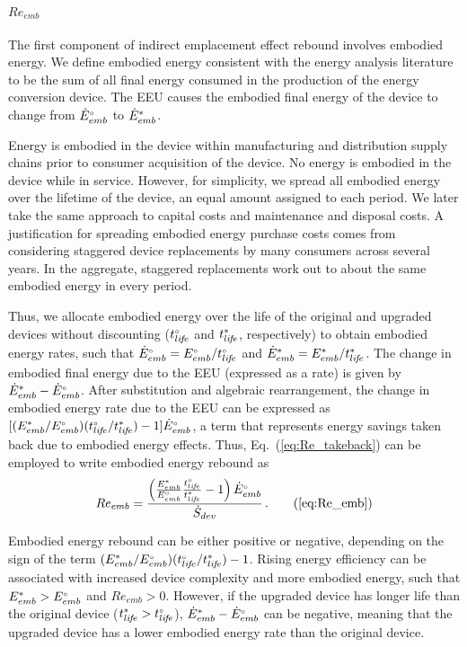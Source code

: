 \paragraph{$Re_{emb}$}
\label{sec:Re_emb}

The first component of indirect emplacement effect rebound
involves embodied energy.
We define embodied energy consistent with the energy analysis literature
to be the sum of all final energy consumed
in the production of the energy conversion device.
The EEU
causes the embodied final energy of the device to change
from ${}{\dot{E}}^{\scriptscriptstyle \circ}_{emb}$ to ${\dot{E}}^*_{emb}$.

Energy is embodied in the device within manufacturing and distribution supply chains
prior to consumer acquisition of the device.
No energy is embodied in the device while in service.
However, for simplicity, we spread all embodied energy
over the lifetime of the device,
an equal amount assigned to each period.
We later take the same approach to capital costs and
maintenance and disposal costs.
A justification for spreading embodied energy purchase costs comes from considering
staggered device replacements by many consumers across several years.
In the aggregate, staggered replacements
work out to about the same embodied energy in every period.

Thus, we allocate embodied energy over the life of the original and upgraded devices
without discounting
(${}{t}^{\scriptscriptstyle \circ}_{li\!f\!e}$ and ${t}^*_{li\!f\!e}$, respectively)
to obtain embodied energy rates, such that
${}{\dot{E}}^{\scriptscriptstyle \circ}_{emb} = {}{E}^{\scriptscriptstyle \circ}_{emb} / {}{t}^{\scriptscriptstyle \circ}_{li\!f\!e}$
and 
${\dot{E}}^*_{emb} = {E}^*_{emb} / {t}^*_{li\!f\!e}$.
The change in embodied final energy due to the EEU (expressed as a rate) is given by
${\dot{E}}^*_{emb} - {}{\dot{E}}^{\scriptscriptstyle \circ}_{emb}$.
After substitution and algebraic rearrangement,
the change in embodied energy rate due to the EEU can be expressed as
$[ ({E}^*_{emb}/{}{E}^{\scriptscriptstyle \circ}_{emb})({}{t}^{\scriptscriptstyle \circ}_{li\!f\!e}/{t}^*_{li\!f\!e}) - 1 ] {}{\dot{E}}^{\scriptscriptstyle \circ}_{emb}$, 
a term that represents energy savings taken back due to embodied energy effects.
Thus, Eq.~(\ref{eq:Re_takeback}) can be employed to write embodied energy rebound as
%
\begin{equation} 
  Re_{emb} = \Reembeqn{} \, . \tag{\ref{eq:Re_emb}}
\end{equation}

Embodied energy rebound can be either positive or negative, depending on 
the sign of the term
$({E}^*_{emb}/{}{E}^{\scriptscriptstyle \circ}_{emb})({}{t}^{\scriptscriptstyle \circ}_{li\!f\!e}/{t}^*_{li\!f\!e}) - 1$.
Rising energy efficiency can be associated with increased device complexity
and more embodied energy,
such that ${E}^*_{emb} > {}{E}^{\scriptscriptstyle \circ}_{emb}$ and $Re_{emb} > 0$.
However, if the upgraded device has longer life than the original device
(${t}^*_{li\!f\!e} > {}{t}^{\scriptscriptstyle \circ}_{li\!f\!e}$),
${\dot{E}}^*_{emb} - {}{\dot{E}}^{\scriptscriptstyle \circ}_{emb}$ can be negative,
meaning that the upgraded device has a lower embodied energy rate than the original device.


